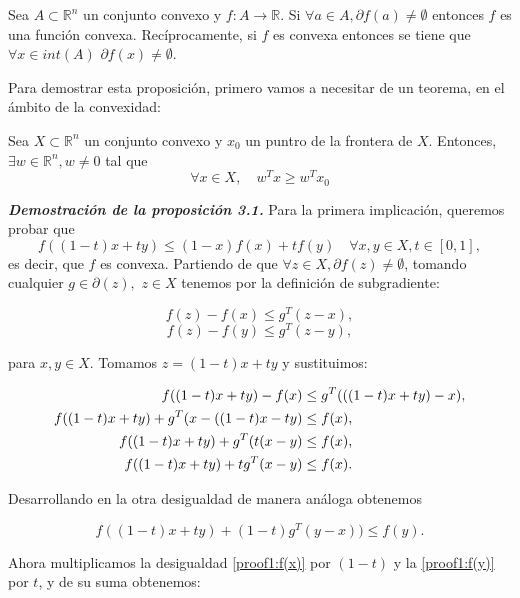 \begin{proposicion}
\label{prop:subgrad}
    Sea $A \subset \mathbb{R}^n$ un conjunto convexo y $f:A \rightarrow \mathbb{R}$. Si $\forall a \in A, \partial f(a) \neq \emptyset$ entonces $f$ es una función convexa. Recíprocamente, si $f$ es convexa  entonces se tiene que $\forall x \in int(A)$ $\partial f(x) \neq \emptyset$.
\end{proposicion}

Para demostrar esta proposición, primero vamos a necesitar de un teorema, en el ámbito de la convexidad:

\begin{teorema}
    Sea $X \subset \mathbb{R}^n$ un conjunto convexo y $x_0$ un puntro de la frontera de $X$. Entonces, $\exists w \in \mathbb{R}^n, w \neq 0$ tal que
    $$\forall x \in X, \quad w^Tx \geq w^T x_0$$
\end{teorema}

\textbf{\textit{Demostración de la proposición 3.1.}}
Para la primera implicación, queremos probar que 
$$f((1-t)x+ty) \leq (1-x)f(x)+tf(y) \quad \forall x,y \in X, t \in [0,1],$$
es decir, que $f$ es convexa. Partiendo de que $\forall z \in X,  \partial f(z) \neq \emptyset $, tomando cualquier $g \in \partial(z),$ $z \in X$ tenemos por la definición de subgradiente:

$$f(z) - f(x) \leq g^T(z-x),$$
$$f(z) - f(y) \leq g^T(z-y),$$

para $x,y \in X$. Tomamos $z=(1-t)x + ty$ y sustituimos:

\begin{align}	
	f((1-t)x + ty) - f(x) &\leq g^T(((1-t)x + ty)-x), \notag \\
	f((1-t)x + ty) + g^T(x - ((1-t)x-ty) &\leq f(x), \notag \\
	f((1-t)x + ty) + g^T(t(x-y) &\leq f(x), \notag \\
	f((1-t)x + ty) + tg^T(x-y) &\leq f(x). \label{proof1:f(x)}
\end{align}


Desarrollando en la otra desigualdad de manera análoga obtenemos

\begin{equation}\label{proof1:f(y)}
    f((1-t)x + ty) + (1-t)g^T(y-x)) \leq f(y).
\end{equation}

Ahora multiplicamos la desigualdad \ref{proof1:f(x)} por $(1-t)$ y la \ref{proof1:f(y)} por $t$, y de su suma obtenemos:

